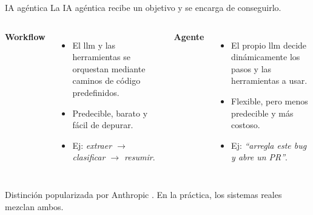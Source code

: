  
\begin{frame}{IA agéntica}
La \alert{IA agéntica} recibe un \alert{objetivo} y se encarga de \alert{conseguirlo}.

\vspace{0.25cm}
\begin{columns}
\textbf{\alert{Workflow}}
\begin{itemize}
    \item El \gls{llm} y las herramientas se orquestan mediante \alert{caminos de código predefinidos}.
    \item Predecible, barato y fácil de depurar.
    \item Ej: \textit{extraer $\rightarrow$ clasificar $\rightarrow$ resumir}.
\end{itemize}
 
\textbf{\alert{Agente}}
\begin{itemize}
    \item El propio \gls{llm} \alert{decide dinámicamente} los pasos y las herramientas a usar.
    \item Flexible, pero menos predecible y más costoso.
    \item Ej: \textit{``arregla este bug y abre un PR''}.
\end{itemize}
\end{columns}
 
\vspace{0.3cm}
Distinción popularizada por Anthropic \cite{anthropic2024building}. En la práctica, los sistemas reales mezclan ambos.
\end{frame}
 
